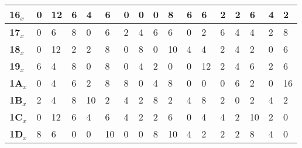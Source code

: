 \begin{longtable}[c]{|l|l|l|l|l|l|l|l|l|l|l|l|l|l|l|l|l|}
\textbf{16$_x$} & 0              & 12             & 6              & 4              & 6              & 0              & 0              & 0              & 8              & 6              & 6              & 2              & 2              & 6              & 4              & 2              \\ \hline
\textbf{17$_x$} & 0              & 6              & 8              & 0              & 6              & 2              & 4              & 6              & 6              & 0              & 2              & 6              & 4              & 4              & 2              & 8              \\ \hline
\textbf{18$_x$} & 0              & 12             & 2              & 2              & 8              & 0              & 8              & 0              & 10             & 4              & 4              & 2              & 4              & 2              & 0              & 6              \\ \hline
\textbf{19$_x$} & 6              & 4              & 8              & 0              & 8              & 0              & 4              & 2              & 0              & 0              & 12             & 2              & 4              & 6              & 2              & 6              \\ \hline
\textbf{1A$_x$} & 0              & 4              & 6              & 2              & 8              & 8              & 0              & 4              & 8              & 0              & 0              & 0              & 6              & 2              & 0              & 16             \\ \hline
\textbf{1B$_x$} & 2              & 4              & 8              & 10             & 2              & 4              & 2              & 8              & 2              & 4              & 8              & 2              & 0              & 2              & 4              & 2              \\ \hline
\textbf{1C$_x$} & 0              & 12             & 6              & 4              & 6              & 4              & 2              & 2              & 6              & 0              & 4              & 4              & 2              & 10             & 2              & 0              \\ \hline
\textbf{1D$_x$} & 8              & 6              & 0              & 0              & 10             & 0              & 0              & 8              & 10             & 4              & 2              & 2              & 2              & 8              & 4              & 0              \\ \hline

\end{longtable}

